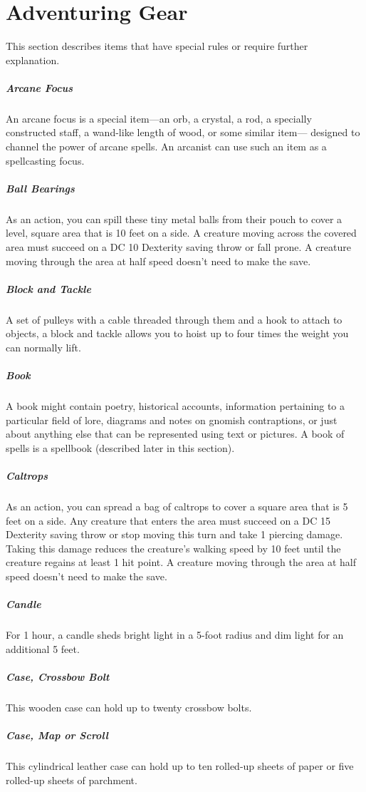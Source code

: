 \section{Adventuring Gear}

This section describes items that have special rules or require further explanation.

\subparagraph*{Arcane Focus} An arcane focus is a special item—an orb, a crystal, a rod, a specially constructed staff, a wand-like length of wood, or some similar item— designed to channel the power of arcane spells. An arcanist can use such an item as a spellcasting focus.

\subparagraph*{Ball Bearings} As an action, you can spill these tiny metal balls from their pouch to cover a level, square area that is 10 feet on a side. A creature moving across the covered area must succeed on a DC 10 Dexterity saving throw or fall prone. A creature moving through the area at half speed doesn't need to make the save.

\subparagraph*{Block and Tackle} A set of pulleys with a cable threaded through them and a hook to attach to objects, a block and tackle allows you to hoist up to four times the weight you can normally lift.

\subparagraph*{Book} A book might contain poetry, historical accounts, information pertaining to a particular field of lore, diagrams and notes on gnomish contraptions, or just about anything else that can be represented using text or pictures. A book of spells is a spellbook (described later in this section).

\subparagraph*{Caltrops} As an action, you can spread a bag of caltrops to cover a square area that is 5 feet on a side. Any creature that enters the area must succeed on a DC 15 Dexterity saving throw or stop moving this turn and take 1 piercing damage. Taking this damage reduces the creature's walking speed by 10 feet until the creature regains at least 1 hit point. A creature moving through the area at half speed doesn't need to make the save.

\subparagraph*{Candle} For 1 hour, a candle sheds bright light in a 5-foot radius and dim light for an additional 5 feet.

\subparagraph*{Case, Crossbow Bolt} This wooden case can hold up to twenty crossbow bolts.

\subparagraph*{Case, Map or Scroll} This cylindrical leather case can hold up to ten rolled-up sheets of paper or five rolled-up sheets of parchment.

